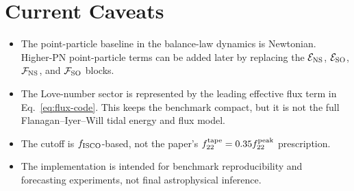 \documentclass[11pt]{article}
\begin{document}
\section{Current Caveats}

\begin{itemize}
  \item The point-particle baseline in the balance-law dynamics is Newtonian.
  Higher-PN point-particle terms can be added later by replacing the
  \({\cal E}_{\rm NS}\), \({\cal E}_{\rm SO}\), \({\cal F}_{\rm NS}\), and
  \({\cal F}_{\rm SO}\) blocks.
  \item The Love-number sector is represented by the leading effective flux
  term in Eq.~\eqref{eq:flux-code}.  This keeps the benchmark compact, but it
  is not the full Flanagan--Iyer--Will tidal energy and flux model.
  \item The cutoff is \(f_{\rm ISCO}\)-based, not the paper's
  \(f_{22}^{\rm tape}=0.35f_{22}^{\rm peak}\) prescription.
  \item The implementation is intended for benchmark reproducibility and
  forecasting experiments, not final astrophysical inference.
\end{itemize}
\end{document}
